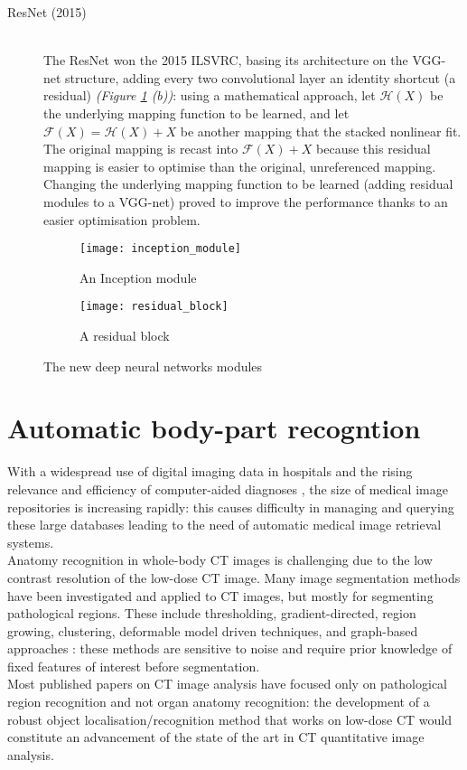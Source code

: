 \documentclass[../main.tex]{subfiles}
\begin{document}
\begin{description}
\item[ResNet (2015)] \cite{Wu2017} \hfill \\
The ResNet won the 2015 ILSVRC, basing its architecture on the VGG-net structure, adding every two convolutional layer an identity shortcut (a residual) \textit{(Figure \ref{fig:blocks} (b))}: using a mathematical approach, let $\mathcal {H}(X)$ be the underlying mapping function to be learned, and let $\mathcal{F}(X)=\mathcal {H}(X) + X $ be another mapping that the stacked nonlinear fit. The original mapping is recast into $\mathcal{F}(X)+X$ because this residual mapping is easier to optimise than the original, unreferenced mapping. \cite{Wu2017} \\
Changing the underlying mapping function to be learned (adding residual modules to a VGG-net) proved to improve the performance thanks to an easier optimisation problem.
\end{description}


\begin{figure}[H]
   \centering
    \begin{subfigure}{0.4\linewidth}
        \texttt{[image: inception\_module]}
        \caption{An Inception module} \cite{Szegedy2015}
    \end{subfigure}
    \begin{subfigure}{0.4\linewidth}
        \texttt{[image: residual\_block]}
        \caption{A residual block} \cite{Wu2017}
    \end{subfigure}
   
  \caption{The new deep neural networks modules}
  \label{fig:blocks}
\end{figure}


\clearpage
\newpage
\section{Automatic body-part recogntion}
With a widespread use of digital imaging data in hospitals and the rising relevance and efficiency of computer-aided diagnoses , the size of medical image repositories is increasing rapidly: this causes difficulty in managing and querying these large databases leading to the need of automatic medical image retrieval systems. \cite{Qayyum2017} \\

Anatomy recognition in whole-body CT images is challenging due to the low contrast resolution of the low-dose CT image. Many image segmentation methods have been investigated and applied to CT images, but mostly for segmenting pathological regions. These include thresholding, gradient-directed, region growing, clustering, deformable model driven techniques, and graph-based approaches \cite{Wang}: these methods are sensitive to noise and require prior knowledge of fixed features of interest before segmentation. \\
Most published papers on CT image analysis have focused only on pathological region recognition and not organ anatomy recognition: the development of a robust object localisation/recognition method that works on low-dose CT would constitute an advancement of the state of the art in CT quantitative image analysis.\cite{Wang}
\end{document}
